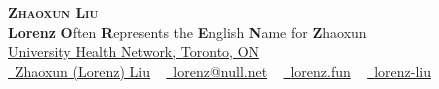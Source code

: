\documentclass[letterpaper,11pt]{article}
\begin{document}

\begin{center}
    {\Huge \scshape \textbf{Zhaoxun Liu}} \\ \vspace{5pt}
    {\Large \textbf{Lorenz}} {\textbf{O}ften \textbf{R}epresents the \textbf{E}nglish \textbf{N}ame for \textbf{Z}haoxun} \\ \vspace{5pt}
    \href{https://temertysimcentre.com/surgical-artificial-intelligence-research-academy-sara/}{University Health Network, Toronto, ON} \\ \vspace{2pt}
    \small \href{https://www.linkedin.com/in/lorenz-liu/}{\raisebox{-0.1\height}\faLinkedin\ Zhaoxun (Lorenz) Liu} ~ \href{mailto:lorenz@null.net}{\raisebox{-0.2\height}\faEnvelope\  {lorenz@null.net}} ~
    \href{https://lorenz.fun/}{\raisebox{-0.2\height}\faHome\ {lorenz.fun}}  ~
    \href{https://github.com/lorenz-liu}{\raisebox{-0.2\height}\faGithub\ {lorenz-liu}}
    \vspace{-8pt}
\end{center}


\end{document}
